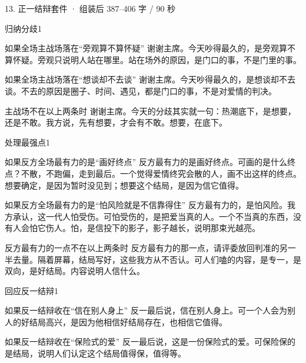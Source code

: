 \documentclass[script,pro]{debate}
\begin{document}
\begin{kit}{13. 正一结辩}{套件 · 组装后 387–406 字 / 90 秒}
\begin{pick}{归纳分歧}{1}
\begin{module}{如果全场主战场落在“旁观算不算怀疑”}
谢谢主席。今天吵得最久的，是旁观算不算怀疑。旁观只说明人站在哪里。站在场外的原因，是门口的事，不是门里的事。
\end{module}
\begin{module}{如果全场主战场落在“想谈却不去谈”}
谢谢主席。今天吵得最久的，是想谈却不去谈。不去的原因是圈子、时间、遇见，都是门口的事，不是对爱情的判决。
\end{module}
\begin{fallback}{主战场不在以上两条时}
谢谢主席。今天的分歧其实就一句：热潮底下，是想要，还是不敢。我方说，先有想要，才会有不敢。想要，在底下。
\end{fallback}
\end{pick}
\begin{pick}{处理最强点}{1}
\begin{module}{如果反方全场最有力的是“画好终点”}
反方最有力的是画好终点。可画的是什么终点？不散，不跑偏，走到最后。一个觉得爱情终究会散的人，画不出这样的终点。想要确定，是因为暂时没见到；想要这个结局，是因为信它值得。
\end{module}
\begin{module}{如果反方全场最有力的是“怕风险就是不信靠得住”}
反方最有力的，是怕风险。我方承认，这一代人怕受伤。可怕受伤的，是把爱当真的人。一个不当真的东西，没有人会怕它伤人。怕，是信投下的影子，影子越长，说明那束光越亮。
\end{module}
\begin{fallback}{反方最有力的一点不在以上两条时}
反方最有力的那一点，请评委放回判准的另一半去量。隔着屏幕，结局写好，这些我方从不否认。可人们嗑的内容，是专一，是双向，是好结局。内容说明人信什么。
\end{fallback}
\end{pick}
\begin{pick}{回应反一结辩}{1}
\begin{module}{如果反一结辩收在“信在别人身上”}
反一最后说，信在别人身上。可一个人会为别人的好结局高兴，是因为他相信好结局存在，也相信它值得。
\end{module}
\begin{module}{如果反一结辩收在“保险式的爱”}
反一最后说，这是一份保险式的爱。可保险保的是结局，说明人们认定这个结局值得保，值得等。
\end{module}

\end{pick}
\end{kit}
\end{document}
